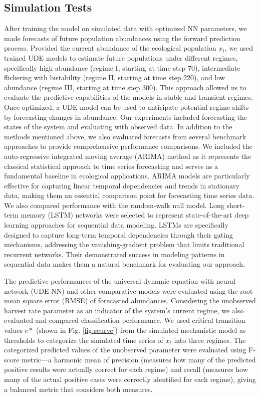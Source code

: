 \documentclass[openacc]{rsproca_new}%
\begin{document}
\subsection{Simulation Tests}
After training the model on simulated data with optimized NN parameters, we made forecasts of future population abundances using the forward prediction process. Provided the current abundance of the ecological population $x_t$, we used trained UDE models to estimate future populations under different regimes, specifically high abundance (regime I, starting at time step 70), intermediate flickering with bistability (regime II, starting at time step 220), and low abundance (regime III, starting at time step 300). This approach allowed us to evaluate the predictive capabilities of the models in stable and transient regimes. Once optimized, a UDE model can be used to anticipate potential regime shifts by forecasting changes in abundance. 
% 
Our experiments included forecasting the states of the system and evaluating with observed data. In addition to the methods mentioned above, we also evaluated forecasts from several benchmark approaches to provide comprehensive performance comparisons.
We included the auto-regressive integrated moving average (ARIMA) method \cite{durbin2012time} as it represents the classical statistical approach to time series forecasting and serves as a fundamental baseline in ecological applications. ARIMA models are particularly effective for capturing linear temporal dependencies and trends in stationary data, making them an essential comparison point for forecasting time series data. We also compared performance with the random-walk null model.
Long short-term memory (LSTM) networks \cite{Hochreiter} were selected to represent state-of-the-art deep learning approaches for sequential data modeling. LSTMs are specifically designed to capture long-term temporal dependencies through their gating mechanisms, addressing the vanishing-gradient problem that limits traditional recurrent networks. Their demonstrated success in modeling patterns in sequential data makes them a natural benchmark for evaluating our approach.

The predictive performances of the universal dynamic equation with neural network (UDE-NN) and other comparative models were evaluated using the root mean square error (RMSE) of forecasted abundances. Considering the unobserved harvest rate parameter as an indicator of the system's current regime, we also evaluated and compared classification performance. We used critical transition values $c*$ (shown in Fig. \ref{fig:scurve}) from the simulated mechanistic model \textcite{Tilman2024} as thresholds to categorize the simulated time series of $x_t$ into three regimes. The categorized predicted values of the unobserved parameter were evaluated using F-score metric---a harmonic mean of precision (measures how many of the predicted positive results were actually correct for each regime) and recall (measures how many of the actual positive cases were correctly identified for each regime), giving a balanced metric that considers both measures. 
% 
\end{document}
